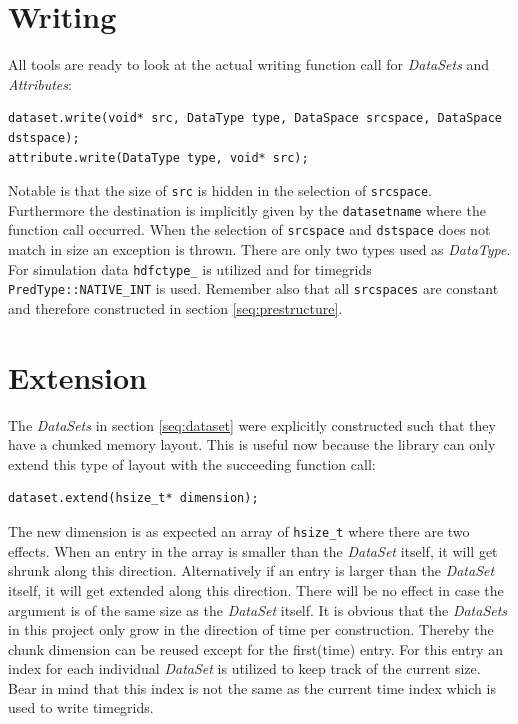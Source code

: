 \section{Writing}
\label{seq:writing}
All tools are ready to look at the actual writing function call for \textit{DataSets} and \textit{Attributes}:
 
\begin{lstlisting}
dataset.write(void* src, DataType type, DataSpace srcspace, DataSpace dstspace);
attribute.write(DataType type, void* src);
\end{lstlisting}
Notable is that the size of \texttt{src} is hidden in the selection of \texttt{srcspace}. Furthermore the destination is implicitly given by the \texttt{datasetname} where the function call occurred. When the selection of \texttt{srcspace} and \texttt{dstspace} does not match in size an exception is thrown. There are only two types used as \textit{DataType}. For simulation data \texttt{hdfctype\_} is utilized and for timegrids \texttt{PredType::NATIVE\_INT} is used. Remember also that all \texttt{srcspaces} are constant and therefore constructed in section \ref{seq:prestructure}.

\section{Extension}
\label{seq:extension}
The \textit{DataSets} in section \ref{seq:dataset} were explicitly constructed such that they have a chunked memory layout. This is useful now because the library can only extend this type of layout with the succeeding function call: 
\begin{lstlisting}
dataset.extend(hsize_t* dimension);
\end{lstlisting}
The new dimension is as expected an array of \texttt{hsize\_t} where there are two effects. When an entry in the array is smaller than the \textit{DataSet} itself, it will get shrunk along this direction. Alternatively if an entry is larger than the \textit{DataSet} itself, it will get extended along this direction. There will be no effect in case the argument is of the same size as the \textit{DataSet} itself. It is obvious that the \textit{DataSets} in this project only grow in the direction of time per construction. Thereby the chunk dimension can be reused except for the first(time) entry. For this entry an index for each individual \textit{DataSet} is utilized to keep track of the current size. Bear in mind that this index is not the same as the current time index which is used to write timegrids.


